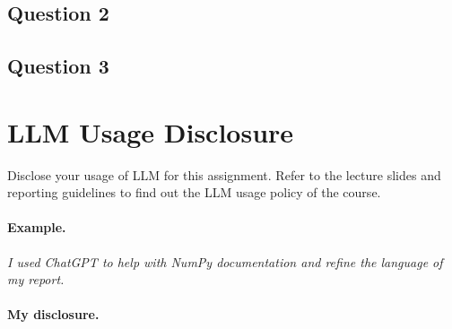 \documentclass[11pt, a4paper]{article}
\begin{document}
\subsection{Question 2}
\answerhere{}

\subsection{Question 3}
\answerhere{}



% 


\section{LLM Usage Disclosure}

\noindent
Disclose your usage of LLM for this assignment. Refer to the lecture slides and
reporting guidelines to find out the LLM usage policy of the course.

\paragraph{Example.}
\textit{I used ChatGPT to help with NumPy documentation and refine the language of my report.}

\paragraph{My disclosure.}
\answerhere{}
\end{document}
